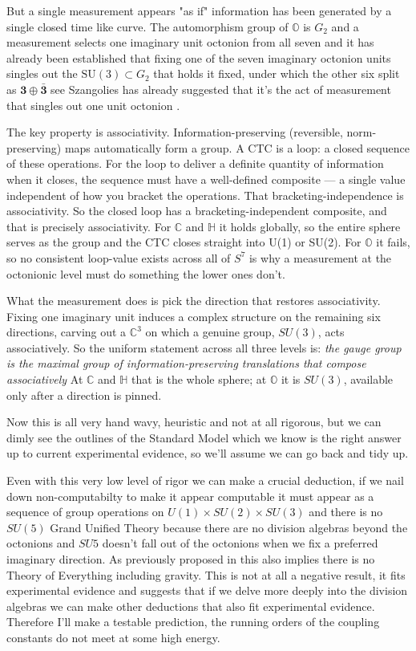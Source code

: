 But a single measurement appears "as if" information has been generated by a single closed time like curve. The automorphism group of $\mathbb{O}$ is $G_2$ and a measurement selects one imaginary unit octonion from all seven and it has already been established that fixing one of the seven imaginary octonion units singles out the $\mathrm{SU}(3) \subset G_2$ that holds it fixed, under which the other six split as $\mathbf{3} \oplus \bar{\mathbf{3}}$ see \autocite{gunaydingursey1974quark, conway_2003} Szangolies has already suggested that it's the act of measurement that singles out one unit octonion \autocite{szangolies2025standardmodel}. 

The key property is associativity. Information-preserving (reversible, norm-preserving) maps automatically form a group. A CTC is a loop: a closed sequence of these operations. For the loop to deliver a definite quantity of information when it closes, the sequence must have a well-defined composite — a single value independent of how you bracket the operations. That bracketing-independence is associativity. So the closed loop has a bracketing-independent composite, and that is precisely associativity. For $\mathbb{C}$ and $\mathbb{H}$ it holds globally, so the entire sphere serves as the group and the CTC closes straight into U(1) or SU(2). For $\mathbb{O}$ it fails, so no consistent loop-value exists across all of $S^7$ is why a measurement at the octonionic level must do something the lower ones don't.

What the measurement does is pick the direction that restores associativity. Fixing one imaginary unit induces a complex structure on the remaining six directions, carving out a $\mathbb{C}^3$ on which a genuine group, $SU(3)$, acts associatively. So the uniform statement across all three levels is: \emph{the gauge group is the maximal group of information-preserving translations that compose associatively} At $\mathbb{C}$ and $\mathbb{H}$ that is the whole sphere; at $\mathbb{O}$ it is $SU(3)$, available only after a direction is pinned.

Now this is all very hand wavy, heuristic and not at all rigorous, but we can dimly see the outlines of the Standard Model which we know is the right answer up to current experimental evidence, so we'll assume we can go back and tidy up. 

Even with this very low level of rigor we can make a crucial deduction, if we nail down non-computabilty to make it appear computable it must appear as a sequence of group operations on $U(1) \times SU(2) \times SU(3)$ and there is no $SU(5)$ Grand Unified Theory because there are no division algebras beyond the octonions \autocite{hurwitz1898composition} and $SU{5}$ doesn't fall out of the octonions when we fix a preferred imaginary direction. As previously proposed in \autocite{small_2006} this also implies there is no Theory of Everything including gravity. This is not at all a negative result, it fits experimental evidence and suggests that if we delve more deeply into the division algebras we can make other deductions that also fit experimental evidence. Therefore I'll make a testable prediction, the running orders of the coupling constants do not meet at some high energy. 

